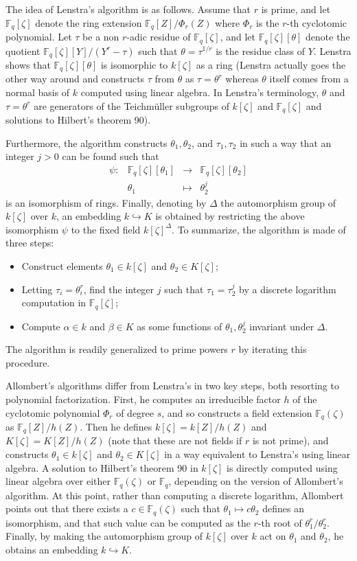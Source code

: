 \documentclass[12pt]{article}
\theoremstyle{plain}
\theoremstyle{definition}
\def\F{\ensuremath{\mathbb{F}}}
\newcounter{algorithm}
\begin{document}
The idea of Lenstra's algorithm is as follows.  Assume that $r$ is
prime, and let $\F_q[\zeta]$ denote the ring extension $\F_q[Z] /
\Phi_r(Z)$ where $\Phi_r$ is the $r$-th cyclotomic polynomial.  Let
$\tau$ be a non $r$-adic residue of $\F_q[\zeta]$, and let
$\F_q[\zeta][\theta]$ denote the quotient $\F_q[\zeta][Y]/(Y^r -
\tau)$ such that $\theta=\tau^{1/r}$ is the residue class of $Y$.
Lenstra shows that $\F_q[\zeta][\theta]$ is isomorphic to $k[\zeta]$
as a ring (Lenstra actually goes the other way around and constructs
$\tau$ from $\theta$ as $\tau = \theta^r$ whereas $\theta$ itself
comes from a normal basis of $k$ computed using linear algebra.  In
Lenstra's terminology, $\theta$ and $\tau=\theta^r$ are generators of
the Teichm\"uller subgroups of $k[\zeta]$ and $\F_q[\zeta]$ and
solutions to Hilbert's theorem 90).

Furthermore, the algorithm constructs $\theta_1, \theta_2$, and
$\tau_1, \tau_2$ in such a way that an integer $j > 0$ can be found
such that
\[
\begin{array}{lrll}
\psi: & \F_q[\zeta][\theta_1] & \rightarrow & \F_q[\zeta][\theta_2] \\
& \theta_1 & \mapsto & \theta_2^j
\end{array}
\]
is an isomorphism of rings.
Finally, denoting by $\Delta$ the automorphism group of $k[\zeta]$
over $k$, an embedding $k \hookrightarrow K$ is obtained by
restricting the above isomorphism $\psi$ to the fixed field
$k[\zeta]^\Delta$.
To summarize, the algorithm is made of three steps:
\begin{itemize}
\item Construct elements $\theta_1\in k[\zeta]$ and $\theta_2\in K[\zeta]$;
\item Letting $\tau_i=\theta_i^r$, find the integer $j$ such that
  $\tau_1=\tau_2^j$ by a discrete logarithm computation in
  $\F_q[\zeta]$;
\item Compute $\alpha\in k$ and $\beta\in K$ as some functions of
  $\theta_1,\theta_2^j$ invariant under $\Delta$.
\end{itemize}
The algorithm is readily generalized to prime powers $r$ by iterating
this procedure.

Allombert's algorithms differ from Lenstra's in two key steps, both
resorting to polynomial factorization.
First, he computes an irreducible factor $h$ of the cyclotomic
polynomial $\Phi_r$ of degree $s$,
and so constructs a field extension $\F_q(\zeta)$ as $\F_q[Z]/h(Z)$.
Then he defines $k[\zeta]=k[Z]/h(Z)$ and $K[\zeta]=K[Z]/h(Z)$
(note that these are not fields if $r$ is not prime), and constructs
$\theta_1\in k[\zeta]$ and $\theta_2\in K[\zeta]$ in a way equivalent
to Lenstra's using linear algebra. 
A solution to Hilbert's theorem 90 in $k[\zeta]$ is directly
computed using linear algebra over either $\F_q(\zeta)$ or $\F_q$,
depending on the version of Allombert's algorithm.
At this point, rather than computing a discrete
logarithm, Allombert points out that there exists a $c\in\F_q(\zeta)$
such that $\theta_1\mapsto c\theta_2$ defines an isomorphism,
and that such value can be
computed as the $r$-th root of $\theta_1^r/\theta_2^r$.
Finally, by making the automorphism group of $k[\zeta]$ over $k$ act
on $\theta_1$ and $\theta_2$, he obtains an embedding $k \hookrightarrow K$.%
\end{document}
